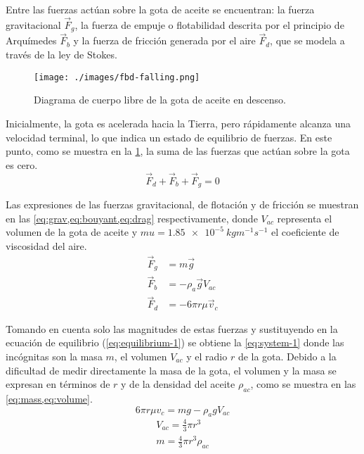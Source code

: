 Entre las fuerzas actúan sobre la gota de aceite se encuentran: la fuerza
gravitacional $\vec{F}_g$, la fuerza de empuje o flotabilidad descrita
por el principio de Arquímedes $\vec{F}_b$ y la fuerza de fricción generada
por el aire $\vec{F}_d$, que se modela a través de la ley de Stokes.

\begin{figure}[htbp!]
    \centering
    \texttt{[image: ./images/fbd-falling.png]}
    \caption{Diagrama de cuerpo libre de la gota de aceite en descenso.}
    \label{fig:fbd-falling-drop}
\end{figure}

Inicialmente, la gota es acelerada hacia la Tierra, pero rápidamente
alcanza una velocidad terminal, lo que indica un estado de equilibrio de fuerzas.
En este punto, como se muestra en la \cref{fig:fbd-falling-drop}, la suma de
las fuerzas que actúan sobre la gota es cero.
\begin{equation}\label{eq:equilibrium-1}
    \vec{F}_d + \vec{F}_b + \vec{F}_g = 0
\end{equation}

Las expresiones de las fuerzas gravitacional, de flotación y de fricción se
muestran en las \cref{eq:grav,eq:bouyant,eq:drag} respectivamente, donde
\( V_{ac} \) representa el volumen de la gota de aceite y
\( mu = \qty{1.85e-5}{kgm^{-1}s^{-1}} \) el coeficiente de viscosidad del aire.
\begin{align}
    \vec{F}_g &= m\vec{g} \label{eq:grav} \\
    \vec{F}_b &= -\rho_a \vec{g}V_{ac} \label{eq:bouyant} \\
    \vec{F}_d &= -6\pi r\mu \vec{v}_c \label{eq:drag}
\end{align}

Tomando en cuenta solo las magnitudes de estas fuerzas y sustituyendo en la
ecuación de equilibrio (\cref{eq:equilibrium-1}) se obtiene la \cref{eq:system-1}
donde las incógnitas son la masa \(m\), el volumen \(V_{ac}\) y el radio \(r\)
de la gota.
Debido a la dificultad de medir directamente la masa de la gota, el volumen y la
masa se expresan en términos de \(r\) y de la densidad del aceite \(\rho_{ac}\),
como se muestra en las \cref{eq:mass,eq:volume}.
\begin{equation}\label{eq:system-1}
    6\pi r\mu v_c = mg - \rho_a g V_{ac}
\end{equation}
\begin{align}
    V_{ac} = \frac{4}{3}\pi r^3 \label{eq:volume} \\
    m = \frac{4}{3}\pi r^3\rho_{ac} \label{eq:mass}
\end{align}

